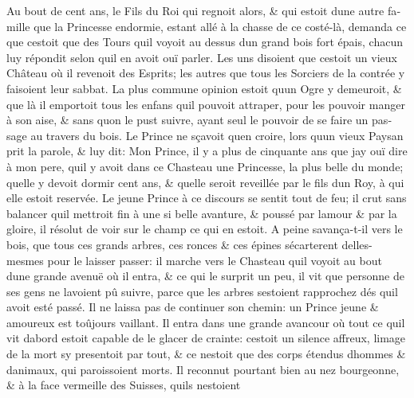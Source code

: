 \documentclass[14pt,a4paper]{memoir}
\begin{document}
\begin{otherlanguage}{french}
Au bout de cent ans, le Fils du Roi qui regnoit alors, \& qui estoit
d\textquotesingle une autre famille que la Princesse endormie, estant
allé à la chasse de ce costé-là, demanda ce que c\textquotesingle estoit
que des Tours qu\textquotesingle il voyoit au dessus
d\textquotesingle un grand bois fort épais, chacun luy répondit selon
qu\textquotesingle il en avoit ouï parler. Les uns disoient que
c\textquotesingle estoit un vieux Château où il revenoit des Esprits;
les autres que tous les Sorciers de la contrée y faisoient leur sabbat.
La plus commune opinion estoit qu\textquotesingle un Ogre y demeuroit,
\& que là il emportoit tous les enfans qu\textquotesingle il pouvoit
attraper, pour les pouvoir manger à son aise, \& sans
qu\textquotesingle on le pust suivre, ayant seul le pouvoir de se faire
un passage au travers du bois. Le Prince ne sçavoit
qu\textquotesingle en croire, lors qu\textquotesingle un vieux Paysan
prit la parole, \& luy dit: Mon Prince, il y a plus de cinquante ans que
j\textquotesingle ay ouï dire à mon pere, qu\textquotesingle il y avoit
dans ce Chasteau une Princesse, la plus belle du monde;
qu\textquotesingle elle y devoit dormir cent ans, \&
qu\textquotesingle elle seroit reveillée par le fils
d\textquotesingle un Roy, à qui elle estoit reservée. Le jeune Prince à
ce discours se sentit tout de feu; il crut sans balancer
qu\textquotesingle il mettroit fin à une si belle avanture, \& poussé
par l\textquotesingle amour \& par la gloire, il résolut de voir sur le
champ ce qui en estoit. A peine s\textquotesingle avança-t-il vers le
bois, que tous ces grands arbres, ces ronces \& ces épines
s\textquotesingle écarterent d\textquotesingle elles-mesmes pour le
laisser passer: il marche vers le Chasteau qu\textquotesingle il voyoit
au bout d\textquotesingle une grande avenuë où il entra, \& ce qui le
surprit un peu, il vit que personne de ses gens ne
l\textquotesingle avoient pû suivre, parce que les arbres
s\textquotesingle estoient rapprochez dés qu\textquotesingle il avoit
esté passé. Il ne laissa pas de continuer son chemin: un Prince jeune \&
amoureux est toûjours vaillant. Il entra dans une grande avancour où
tout ce qu\textquotesingle il vit d\textquotesingle abord estoit capable
de le glacer de crainte: c\textquotesingle estoit un silence affreux,
l\textquotesingle image de la mort s\textquotesingle y presentoit par
tout, \& ce n\textquotesingle estoit que des corps étendus
d\textquotesingle hommes \& d\textquotesingle animaux, qui paroissoient
morts. Il reconnut pourtant bien au nez bourgeonne, \& à la face
vermeille des Suisses, qu\textquotesingle ils n\textquotesingle estoient

\end{otherlanguage}
\end{document}
